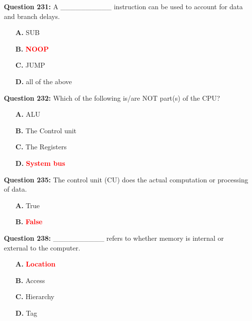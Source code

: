 \documentclass[12pt,a4paper]{article}
\begin{document}
\vspace{0.5cm}

\textbf{Question 231:} A __________ instruction can be used to account for data and branch delays.

\begin{itemize}
    \item[\textbf{A.}] SUB
    \item[\textbf{B.}] \textcolor{red}{\textbf{NOOP}}
    \item[\textbf{C.}] JUMP
    \item[\textbf{D.}] all of the above
\end{itemize}

\vspace{0.5cm}

\textbf{Question 232:} Which of the following is/are NOT part(s) of the CPU?

\begin{itemize}
    \item[\textbf{A.}] ALU
    \item[\textbf{B.}] The Control unit
    \item[\textbf{C.}] The Registers
    \item[\textbf{D.}] \textcolor{red}{\textbf{System bus}}
\end{itemize}

\vspace{0.5cm}

\textbf{Question 235:} The control unit (CU) does the actual computation or processing of data.

\begin{itemize}
    \item[\textbf{A.}] True
    \item[\textbf{B.}] \textcolor{red}{\textbf{False}}
\end{itemize}

\vspace{0.5cm}

\textbf{Question 238:} __________ refers to whether memory is internal or external to the computer.

\begin{itemize}
    \item[\textbf{A.}] \textcolor{red}{\textbf{Location}}
    \item[\textbf{B.}] Access
    \item[\textbf{C.}] Hierarchy
    \item[\textbf{D.}] Tag
\end{itemize}
\end{document}
